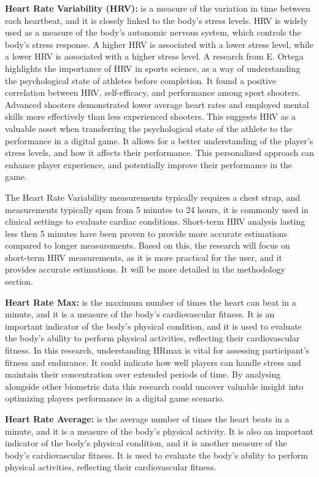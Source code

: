 \textbf{Heart Rate Variability (HRV):} is a measure of the variation in time between each heartbeat, and it is closely linked to
the body's stress levels. HRV is widely used as a measure of the body's autonomic nervous system, which controls the body's stress
response. A higher HRV is associated with a lower stress level, while a lower HRV is associated with a higher stress level. A research
from E. Ortega\cite{ortega2018pre} highlights the importance of HRV in sports science, as a way of understanding the psychological
state of athletes before completion. It found a positive correlation between HRV, self-efficacy, and performance among sport shooters.
Advanced shooters demonstrated lower average heart rates and employed mental skills more effectively than less experienced shooters.
This suggests HRV as a valuable asset when transferring the psychological state of the athlete to the performance in a digital game.
It allows for a better understanding of the player's stress levels, and how it affects their performance. This personalized approach
can enhance player experience, and potentially improve their performance in the game.

The Heart Rate Variability measurements typically requires a chest strap, and measurements typically span from 5 minutes to 24 hours,
it is commonly used in clinical settings to evaluate cardiac conditions.\cite{malik1996heart} Short-term HRV analysis lasting less then
5 minutes have been proven to provide more accurate estimations compared to longer measurements.\cite{mcnames2006reliability}
Based on this, the research will focus on short-term HRV measurements, as it is more practical for the user, and it provides accurate
estimations. It will be more detailed in the methodology section.

\textbf{Heart Rate Max:} is the maximum number of times the heart can beat in a minute, and it is a measure of the body's
cardiovascular fitness. It is an important indicator of the body's physical condition, and it is used to evaluate the body's ability
to perform physical activities, reflecting their cardiovascular fitness. In this research, understanding HRmax is vital for assessing
participant's fitness and endurance. It could indicate how well players can handle stress and maintain their concentration over
extended periods of time. By analysing alongside other biometric data this research could uncover valuable insight into optimizing
players performance in a digital game scenario.

\textbf{Heart Rate Average:} is the average number of times the heart beats in a minute, and it is a measure of the body's physical
activity. It is also an important indicator of the body's physical condition, and it is another measure of the body's
cardiovascular fitness. It is used to evaluate the body's ability to perform physical activities, reflecting their cardiovascular
fitness.

